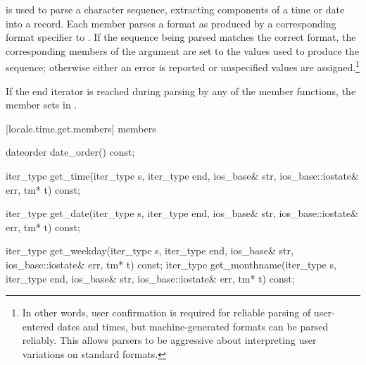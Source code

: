 \pnum
{}
is used to
parse a character sequence, extracting components of a time or date
into a
record.
Each
member parses a format as produced by a corresponding format specifier to
.
If the sequence being parsed matches the correct format, the corresponding
members of the
argument are set to the values used to produce the sequence; otherwise
either an error is reported or unspecified values are assigned.\footnote{In
other words, user confirmation is required for reliable parsing of
user-entered dates and times, but machine-generated formats can be
parsed reliably.
This allows parsers to be aggressive about
interpreting user variations on standard formats.}

\pnum
If the end iterator is reached during parsing by any of the
member functions, the member sets
in .

[locale.time.get.members]{ members}

%
\begin{itemdecl}
dateorder date_order() const;
\end{itemdecl}

\begin{itemdescr}
\pnum
\returns
{}
\end{itemdescr}

%
\begin{itemdecl}
iter_type get_time(iter_type s, iter_type end, ios_base& str,
                   ios_base::iostate& err, tm* t) const;
\end{itemdecl}

\begin{itemdescr}
\pnum
\returns
{}
\end{itemdescr}

%
\begin{itemdecl}
iter_type get_date(iter_type s, iter_type end, ios_base& str,
                   ios_base::iostate& err, tm* t) const;
\end{itemdecl}

\begin{itemdescr}
\pnum
\returns
{}
\end{itemdescr}

%
%
\begin{itemdecl}
iter_type get_weekday(iter_type s, iter_type end, ios_base& str,
                      ios_base::iostate& err, tm* t) const;
iter_type get_monthname(iter_type s, iter_type end, ios_base& str,
                        ios_base::iostate& err, tm* t) const;
\end{itemdecl}

